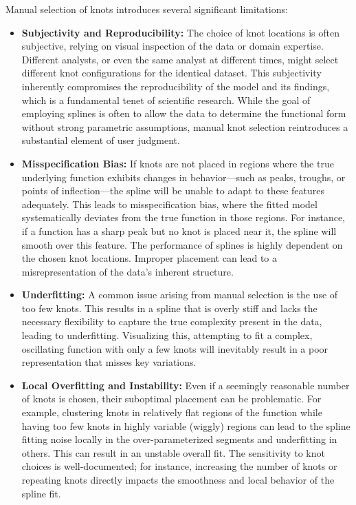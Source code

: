 \documentclass[11pt, a4paper]{article}
\begin{document}
Manual selection of knots introduces several significant limitations:
\begin{itemize}
 \item \textbf{Subjectivity and Reproducibility:} The choice of knot locations is often subjective, relying on visual inspection of the data or domain expertise. Different analysts, or even the same analyst at different times, might select different knot configurations for the identical dataset. This subjectivity inherently compromises the reproducibility of the model and its findings, which is a fundamental tenet of scientific research. While the goal of employing splines is often to allow the data to determine the functional form without strong parametric assumptions, manual knot selection reintroduces a substantial element of user judgment.

 \item \textbf{Misspecification Bias:} If knots are not placed in regions where the true underlying function exhibits changes in behavior—such as peaks, troughs, or points of inflection—the spline will be unable to adapt to these features adequately. This leads to misspecification bias, where the fitted model systematically deviates from the true function in those regions. For instance, if a function has a sharp peak but no knot is placed near it, the spline will smooth over this feature. The performance of splines is highly dependent on the chosen knot locations. Improper placement can lead to a misrepresentation of the data's inherent structure.

 \item \textbf{Underfitting:} A common issue arising from manual selection is the use of too few knots. This results in a spline that is overly stiff and lacks the necessary flexibility to capture the true complexity present in the data, leading to underfitting. Visualizing this, attempting to fit a complex, oscillating function with only a few knots will inevitably result in a poor representation that misses key variations.

 \item \textbf{Local Overfitting and Instability:} Even if a seemingly reasonable number of knots is chosen, their suboptimal placement can be problematic. For example, clustering knots in relatively flat regions of the function while having too few knots in highly variable (wiggly) regions can lead to the spline fitting noise locally in the over-parameterized segments and underfitting in others. This can result in an unstable overall fit. The sensitivity to knot choices is well-documented; for instance, increasing the number of knots or repeating knots directly impacts the smoothness and local behavior of the spline fit.


\end{itemize}
\end{document}
